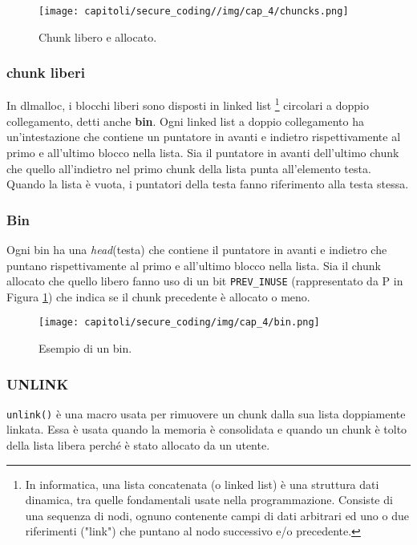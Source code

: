 \begin{figure}[H]
    \centering
    \texttt{[image: capitoli/secure\_coding//img/cap\_4/chuncks.png]}
    \caption{Chunk libero e allocato.}\label{fig:chunk_lib_alloc}
\end{figure}

\subsubsection{chunk liberi}

In dlmalloc, i blocchi liberi sono disposti in linked list
\footnote{In informatica, una lista concatenata (o linked list) è una struttura dati
    dinamica, tra quelle fondamentali usate nella programmazione.
    Consiste di una sequenza di nodi, ognuno contenente campi di dati arbitrari ed
    uno o due riferimenti ("link") che puntano al nodo successivo e/o
    precedente.}
circolari a doppio collegamento, detti anche \textbf{bin}.
Ogni linked list a doppio collegamento ha un'intestazione che contiene un puntatore
in avanti e indietro rispettivamente al primo e all'ultimo blocco
nella lista. Sia il puntatore in avanti dell'ultimo chunk che quello all'indietro nel
primo chunk della lista punta all'elemento testa.
Quando la lista è vuota, i puntatori della testa fanno riferimento alla testa stessa.

\subsubsection{Bin}

Ogni bin ha una \textit{head}(testa) che contiene il puntatore in avanti e indietro
che puntano rispettivamente al primo e all'ultimo blocco nella lista. Sia il chunk
allocato che quello libero fanno uso di un bit \verb|PREV_INUSE|
(rappresentato da P in Figura \ref{fig:chunk_lib_alloc}) che indica se il chunk precedente è allocato o
meno.

\begin{figure}[H]
    \centering
    \texttt{[image: capitoli/secure\_coding/img/cap\_4/bin.png]}
    \caption{Esempio di un bin.}\label{fig:bin}
\end{figure}


\subsubsection{UNLINK}

\verb|unlink()| è una macro usata per rimuovere un chunk dalla sua lista doppiamente
linkata. Essa è usata quando la memoria è consolidata e quando un chunk è tolto della
lista libera perché è stato allocato da un utente.

